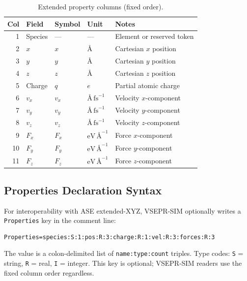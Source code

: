 \documentclass[11pt, a4paper, oneside]{article}
\newcommand{\ang}{\text{\AA}}
\newcommand{\fs}{\text{fs}}
\newcommand{\eV}{\text{eV}}
\begin{document}
\begin{table}[h]
\centering
\begin{tabular}{rllll}
  \toprule
  Col & Field & Symbol & Unit & Notes \\
  \midrule
  1   & Species    & ---  & ---                & Element or reserved token \\
  2   & $x$        & $x$  & $\ang$             & Cartesian $x$ position \\
  3   & $y$        & $y$  & $\ang$             & Cartesian $y$ position \\
  4   & $z$        & $z$  & $\ang$             & Cartesian $z$ position \\
  5   & Charge     & $q$  & $e$                & Partial atomic charge \\
  6   & $v_x$      & $v_x$& $\ang\,\fs^{-1}$   & Velocity $x$-component \\
  7   & $v_y$      & $v_y$& $\ang\,\fs^{-1}$   & Velocity $y$-component \\
  8   & $v_z$      & $v_z$& $\ang\,\fs^{-1}$   & Velocity $z$-component \\
  9   & $F_x$      & $F_x$& $\eV\,\ang^{-1}$   & Force $x$-component \\
  10  & $F_y$      & $F_y$& $\eV\,\ang^{-1}$   & Force $y$-component \\
  11  & $F_z$      & $F_z$& $\eV\,\ang^{-1}$   & Force $z$-component \\
  \bottomrule
\end{tabular}
\caption{Extended property columns (fixed order).}
\label{tab:xyza_cols}
\end{table}

\subsection{Properties Declaration Syntax}
\label{sec:xyza_props}

For interoperability with ASE extended-XYZ, VSEPR-SIM optionally writes a
\texttt{Properties} key in the comment line:

\begin{lstlisting}[caption={Properties key (ASE compatibility).}]
Properties=species:S:1:pos:R:3:charge:R:1:vel:R:3:forces:R:3
\end{lstlisting}

The value is a colon-delimited list of \texttt{name:type:count} triples.
Type codes: \texttt{S} = string, \texttt{R} = real, \texttt{I} = integer.
This key is optional; VSEPR-SIM readers use the fixed column order
regardless.
\end{document}
